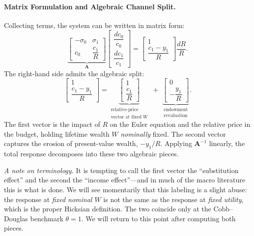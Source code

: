 \paragraph{Matrix Formulation and Algebraic Channel Split.}
Collecting terms, the system can be written in matrix form:
\begin{equation}
\underbrace{\begin{bmatrix} -\sigma_0 & \sigma_1 \\[4pt] c_0 & \dfrac{c_1}{R} \end{bmatrix}}_{\mathbf{A}}
\begin{bmatrix} \dfrac{dc_0}{c_0} \\[8pt] \dfrac{dc_1}{c_1} \end{bmatrix}
= \begin{bmatrix} 1 \\[4pt] \dfrac{c_1 - y_1}{R} \end{bmatrix} \frac{dR}{R}.
\label{eq:matrix-system}
\end{equation}
The right-hand side admits the algebraic split:
\begin{equation}
\begin{bmatrix} 1 \\[4pt] \dfrac{c_1 - y_1}{R} \end{bmatrix}
= \underbrace{\begin{bmatrix} 1 \\[4pt] \dfrac{c_1}{R} \end{bmatrix}}_{\substack{\text{relative-price}\\\text{vector at fixed }W}}
\;+\; \underbrace{\begin{bmatrix} 0 \\[4pt] -\dfrac{y_1}{R} \end{bmatrix}}_{\substack{\text{endowment}\\\text{revaluation}}}.
\label{eq:channel-split}
\end{equation}
The first vector is the impact of $R$ on the Euler equation and the relative price in the budget, holding lifetime wealth $W$ \emph{nominally} fixed. The second vector captures the erosion of present-value wealth, $-y_1/R$. Applying $\mathbf{A}^{-1}$ linearly, the total response decomposes into these two algebraic pieces.

\medskip
\noindent
\emph{A note on terminology.} It is tempting to call the first vector the ``substitution effect'' and the second the ``income effect''---and in much of the macro literature this is what is done. We will see momentarily that this labeling is a slight abuse: the response at \emph{fixed nominal $W$} is not the same as the response at \emph{fixed utility}, which is the proper Hicksian definition. The two coincide only at the Cobb--Douglas benchmark $\theta = 1$. We will return to this point after computing both pieces.

